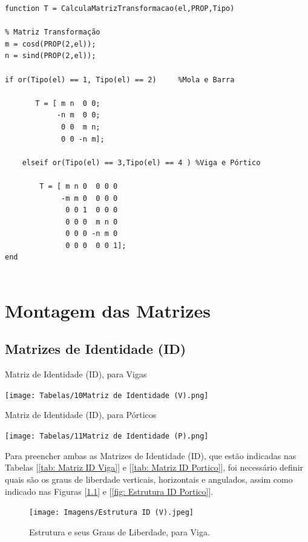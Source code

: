 \documentclass[deposito, acronym, symbols]{fei}
\begin{document}
\begin{lstlisting}
function T = CalculaMatrizTransformacao(el,PROP,Tipo)

% Matriz Transformação
m = cosd(PROP(2,el));
n = sind(PROP(2,el));

if or(Tipo(el) == 1, Tipo(el) == 2)     %Mola e Barra 

       T = [ m n  0 0;
            -n m  0 0;
             0 0  m n;
             0 0 -n m];
      
    elseif or(Tipo(el) == 3,Tipo(el) == 4 ) %Viga e Pórtico

        T = [ m n 0  0 0 0
             -m m 0  0 0 0
              0 0 1  0 0 0 
              0 0 0  m n 0
              0 0 0 -n m 0
              0 0 0  0 0 1];
end     
      
\end{lstlisting}

\chapter{Montagem das Matrizes}

\section{Matrizes de Identidade (ID)}

\begin{table}[!hb]
 \centering
    \caption{Matriz de Identidade (ID), para Vigas}
    \texttt{[image: Tabelas/10Matriz de Identidade (V).png]}
    \label{tab: Matriz ID Viga}
 \end{table}

 \begin{table}[!hb]
 \centering
    \caption{Matriz de Identidade (ID), para Pórticos}
    \texttt{[image: Tabelas/11Matriz de Identidade (P).png]}
    \label{tab: Matriz ID Portico}
 \end{table}    

Para preencher ambas as Matrizes de Identidade (ID), que estão indicadas nas Tabelas  [\ref{tab: Matriz ID Viga}] e [\ref{tab: Matriz ID Portico}], foi necessário definir quais são os graus de liberdade verticais, horizontais e angulados, assim como indicado nas Figuras [\ref{fig: Estrutura ID Viga}] e [\ref{fig: Estrutura ID Portico}].

 \begin{figure}[!htb]
 \centering
    \caption{Estrutura e seus Graus de Liberdade, para Viga.}
    \texttt{[image: Imagens/Estrutura ID (V).jpeg]}
    \label{fig: Estrutura ID Viga}
 \end{figure}
\end{document}
